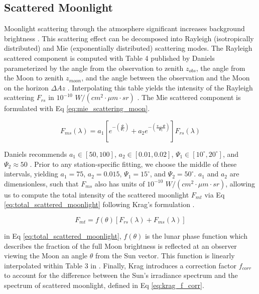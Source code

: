 \subsection{Scattered Moonlight}

Moonlight scattering through the atmosphere significant increases background brightness \cite{krag2003}. This scattering effect can be decomposed into Rayleigh (isotropically distributed) and Mie (exponentially distributed) scattering modes. The Rayleigh scattered component is computed with Table 4 published by Daniels parameterized by the angle from the observation to zenith $z_{obs}$, the angle from the Moon to zenith $z_{moon}$, and the angle between the observation and the Moon on the horizon $\Delta Az$ \cite{daniels1977}. Interpolating this table yields the intensity of the Rayleigh scattering $F_{rs}$ in $10^{-10}$ $W/(cm^2 \cdot \mu m \cdot sr)$ \cite{krag2003}. The Mie scattered component is formulated with Eq \ref{eq:mie_scattering_moon}.

\begin{equation} \label{eq:mie_scattering_moon}
  F_{ms}(\lambda) = a_1 \left[ e^{-\left(\frac{\Psi}{\Psi_1}\right)} + a_2 e^{-\left(\frac{\pi - \Psi}{\Psi_2}\right)} \right] F_{rs}(\lambda)
\end{equation}

Daniels recommends $a_1 \in [50, 100]$, $a_2 \in [0.01, 0.02]$, $\Psi_1 \in [10^\circ, 20^\circ]$, and $\Psi_2 \approx 50$ \cite{daniels1977}. Prior to any station-specific fitting, we choose the middle of these intervals, yielding $a_1 = 75$, $a_2 = 0.015$, $\Psi_1 = 15^\circ$, and $\Psi_2 = 50^\circ$. $a_1$ and $a_2$ are dimensionless, such that $F_{ms}$ also has units of $10^{-10}$ $W/(cm^2 \cdot \mu m \cdot sr)$, allowing us to compute the total intensity of the scattered moonlight $F_{mt}$ via Eq \ref{eq:total_scattered_moonlight} following Krag's formulation \cite{krag2003}.

\begin{equation} \label{eq:total_scattered_moonlight}
  F_{mt} = f(\theta) \left[ F_{rs}(\lambda) + F_{ms}(\lambda) \right]
\end{equation}

in Eq \ref{eq:total_scattered_moonlight}, $f(\theta)$ is the lunar phase function which describes the fraction of the full Moon brightness is reflected at an observer viewing the Moon an angle $\theta$ from the Sun vector. This function is linearly interpolated within Table 3 in \cite{daniels1977}. Finally, Krag introduces a correction factor $f_{corr}$ to account for the difference between the Sun's irradiance spectrum and the spectrum of scattered moonlight, defined in Eq \ref{eq:krag_f_corr}.

